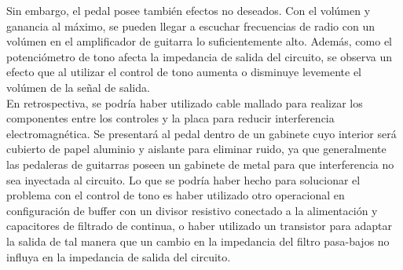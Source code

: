 Sin embargo, el pedal posee también efectos no deseados. Con el volúmen y ganancia al máximo, se pueden llegar a escuchar frecuencias de radio con un volúmen en el amplificador de guitarra lo suficientemente alto. Además, como el potenciómetro de tono afecta la impedancia de salida del circuito, se observa un efecto que al utilizar el control de tono aumenta o disminuye levemente el volúmen de la señal de salida.\\

En retrospectiva, se podría haber utilizado cable mallado para realizar los componentes entre los controles y la placa para reducir interferencia electromagnética. Se presentará al pedal dentro de un gabinete cuyo interior será cubierto de papel aluminio y aislante para eliminar ruido, ya que generalmente las pedaleras de guitarras poseen un gabinete de metal para que interferencia no sea inyectada al circuito.
Lo que se podría haber hecho para solucionar el problema con el control de tono es haber utilizado otro operacional en configuración de buffer con un divisor resistivo conectado a la alimentación y capacitores de filtrado de continua, o haber utilizado un transistor para adaptar la salida de tal manera que un cambio en la impedancia del filtro pasa-bajos no influya en la impedancia de salida del circuito.

